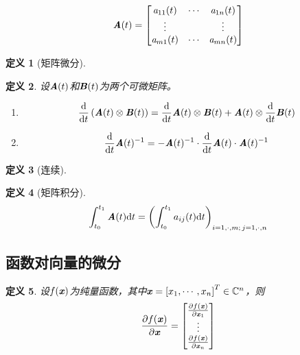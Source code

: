 \documentclass[UTF8]{ctexart}
\newtheorem{defi}{定义}
\newcommand{\ud}{\mathrm{d}}
\begin{document}
\[
    \boldsymbol{\mathit{A}}(t) = \begin{bmatrix}
        \mathit{a}_{11}(t) & \cdots    & \mathit{a}_{1n}(t)   \\
        \vdots      &           & \vdots        \\
        \mathit{a}_{m1}(t) & \cdots    & \mathit{a}_{mn}(t)
    \end{bmatrix}
\]

\begin{defi}[矩阵微分]

\end{defi}

\begin{defi}
    设$\boldsymbol{\mathit{A}}(t)$和$\boldsymbol{\mathit{B}}(t)$为两个可微矩阵。
    \begin{enumerate}
        \item \[
                \frac{\ud}{\ud t}\left( \MA(t) \otimes \MB(t) \right) = \frac{\ud}{\ud t}\MA(t) \otimes \MB(t) + \MA(t) \otimes \frac{\ud}{\ud t}\MB(t)
                \]
        \item \[
                \frac{\ud}{\ud t} \MA(t)^{-1} = - \MA(t)^{-1} \cdot \frac{\ud}{\ud t}\MA(t)\cdot \MA(t)^{-1}
                \]
    \end{enumerate}
\end{defi}

\begin{defi}[连续]

\end{defi}

\begin{defi}[矩阵积分]
    \[
        \int_{t_0}^{t_1} \MA(t) \ud t = \left( \int_{t_0}^{t_1} a_{ij}(t)\ud t \right)_{i = 1, \cdot, m; \, j = 1, \cdot, n}
    \]
\end{defi}


\subsection{函数对向量的微分}
\label{sub:han_shu_dui_xiang_liang_de_wei_fen_}

\begin{defi}
    设$f(\boldsymbol{\mathit{x}})$为纯量函数，其中$\boldsymbol{\mathit{x}} = \left[x_1, \cdots, x_n \right]^T \in \mathbb{C}^n$，则
    \[
        \frac{\partial f(\boldsymbol{\mathit{x}})}{\partial \boldsymbol{\mathit{x}}} = \begin{bmatrix}
            \frac{\partial f(\boldsymbol{\mathit{x}})}{\partial \boldsymbol{\mathit{x}}_1} \\
            \vdots \\
            \frac{\partial f(\boldsymbol{\mathit{x}})}{\partial \boldsymbol{\mathit{x}}_n}
        \end{bmatrix}
    \]
\end{defi}
\end{document}
